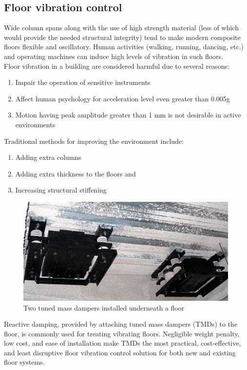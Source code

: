 \subsection{Floor vibration control}
Wide column spans along with the use of high strength material (less of which would provide the needed structural integrity) tend to make modern composite floors flexible and oscillatory. Human activities (walking, running, dancing, etc.) and operating machines can induce high levels of vibration in such floors. \\
Floor vibration in a building are considered harmful due to several reasons:
\begin{enumerate}
\item Impair the operation of sensitive instruments
\item Affect human psychology for acceleration level even greater than 0.005g
\item Motion having peak amplitude greater than 1 mm is not desirable in active environments
\end{enumerate} 
Traditional methods for improving the environment include:
\begin{enumerate}
\item  Adding extra columns
\item  Adding extra thickness to the floors and
\item  Increasing structural stiffening
\end{enumerate} 
\begin{figure}[h]
\centering
\includegraphics[scale=0.9]{"figures/floordamp"}
\caption{Two tuned mass dampers installed underneath a floor}
\label{floordamp}
\end{figure}
Reactive damping, provided by attaching tuned mass dampers (TMDs) to the floor, is commonly used for treating vibrating floors. Negligible weight penalty, low cost, and ease of installation make TMDs the most practical, cost-effective, and least disruptive floor vibration control solution for both new and existing floor systems.


